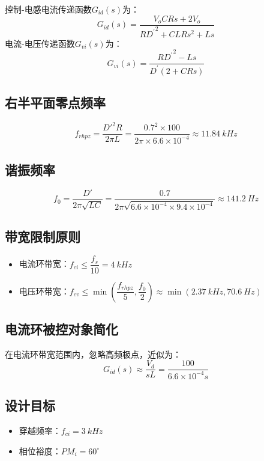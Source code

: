 \documentclass[11pt,a4paper]{article}
\begin{document}
控制-电感电流传递函数$G_{id}\left(s\right)$为：
\begin{equation}
  G_{id}(s)=\frac{V_{o}CRs+2V_{o}}{R{D^{\prime}}^{2}+CLRs^{2}+Ls}
\end{equation}
电流-电压传递函数$G_{vi}\left(s\right)$为：
\begin{equation}
  G_{vi}(s)=\frac{R{D^{\prime}}^{2}-Ls}{D^{\prime}(2+CRs)}
\end{equation}

\subsection{右半平面零点频率}
\begin{equation}
f_{rhpz} = \frac{D'^2 R}{2\pi L} = \frac{0.7^2 \times 100}{2\pi \times 6.6\times10^{-4}} \approx \SI{11.84}{kHz}
\end{equation}

\subsection{谐振频率}
\begin{equation}
f_0 = \frac{D'}{2\pi\sqrt{LC}} = \frac{0.7}{2\pi\sqrt{6.6\times10^{-4} \times 9.4\times10^{-4}}} \approx \SI{141.2}{Hz}
\end{equation}

\subsection{带宽限制原则}
\begin{itemize}
\item 电流环带宽：$f_{ci} \leq \dfrac{f_s}{10} = \SI{4}{kHz}$
\item 电压环带宽：$f_{cv} \leq \min\left(\dfrac{f_{rhpz}}{5}, \dfrac{f_0}{2}\right) \approx \min(\SI{2.37}{kHz}, \SI{70.6}{Hz})$
\end{itemize}

\subsection{电流环被控对象简化}
在电流环带宽范围内，忽略高频极点，近似为：
\begin{equation}
G_{id}(s) \approx \frac{V_d}{sL} = \frac{100}{6.6\times10^{-4}s}
\end{equation}

\subsection{设计目标}
\begin{itemize}
\item 穿越频率：$f_{ci} = \SI{3}{kHz}$
\item 相位裕度：$PM_i = 60^\circ$
\end{itemize}
\end{document}
